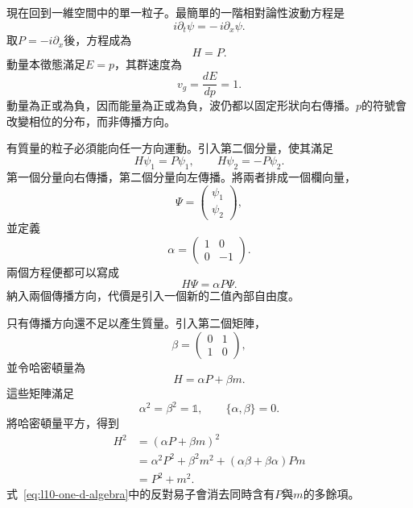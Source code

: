 現在回到一維空間中的單一粒子。最簡單的一階相對論性波動方程是
\begin{equation}
i\partial_t\psi=-\,i\partial_x\psi.
\label{eq:l10-right-mover}
\end{equation}
取\(P=-i\partial_x\)後，方程成為
\begin{equation}
H=P.
\end{equation}
動量本徵態滿足\(E=p\)，其群速度為
\begin{equation}
v_g=\frac{dE}{dp}=1.
\end{equation}
動量為正或為負，因而能量為正或為負，波仍都以固定形狀向右傳播。\(p\)的符號會改變相位的分布，而非傳播方向。

有質量的粒子必須能向任一方向運動。引入第二個分量，使其滿足
\begin{equation}
H\psi_1=P\psi_1,
\qquad
H\psi_2=-P\psi_2.
\label{eq:l10-two-directions}
\end{equation}
第一個分量向右傳播，第二個分量向左傳播。將兩者排成一個欄向量，
\begin{equation}
\Psi=
\begin{pmatrix}
\psi_1\\
\psi_2
\end{pmatrix},
\end{equation}
並定義
\begin{equation}
\alpha=
\begin{pmatrix}
1&0\\
0&-1
\end{pmatrix}.
\end{equation}
兩個方程便都可以寫成
\begin{equation}
H\Psi=\alpha P\Psi.
\label{eq:l10-massless-one-d}
\end{equation}
納入兩個傳播方向，代價是引入一個新的二值內部自由度。

只有傳播方向還不足以產生質量。引入第二個矩陣，
\begin{equation}
\beta=
\begin{pmatrix}
0&1\\
1&0
\end{pmatrix},
\end{equation}
並令哈密頓量為
\begin{equation}
H=\alpha P+\beta m.
\label{eq:l10-massive-one-d}
\end{equation}
這些矩陣滿足
\begin{equation}
\alpha^2=\beta^2=\mathbb{1},
\qquad
\{\alpha,\beta\}=0.
\label{eq:l10-one-d-algebra}
\end{equation}
將哈密頓量平方，得到
\begin{align}
H^2
&=(\alpha P+\beta m)^2\\
&=\alpha^2P^2+\beta^2m^2
  +(\alpha\beta+\beta\alpha)Pm\\
&=P^2+m^2.
\label{eq:l10-one-d-dispersion}
\end{align}
式~\eqref{eq:l10-one-d-algebra}中的反對易子會消去同時含有\(P\)與\(m\)的多餘項。

